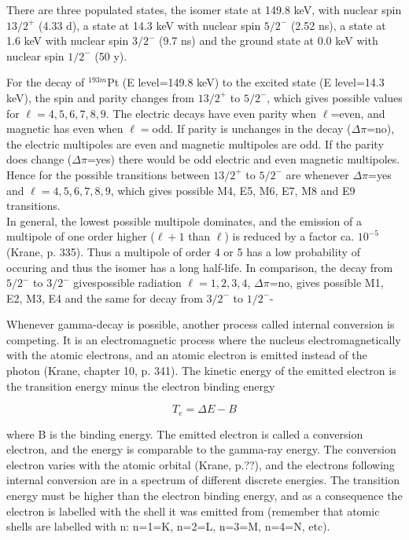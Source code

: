 \documentclass[a4paper,11pt,twoside]{book}
\begin{document}
There are three populated states, the isomer state at 149.8 keV, with nuclear spin $13/2^+$ (4.33 d), a state at 14.3 keV with nuclear spin $5/2^-$ (2.52 ns), a state at 1.6 keV with nuclear spin $3/2^-$ (9.7 ns) and the ground state at 0.0 keV with nuclear spin $1/2^-$ (50 y)\cite{ShamsuzzohaBasunia2017a}. 

For the decay of $^{193m}$Pt (E level=149.8 keV) to the excited state (E level=14.3 keV), the spin and parity changes from $13/2^+$ to $5/2^-$, which gives possible values for $\ell=4,5,6,7,8,9$. The electric decays have even parity when $\ell$=even, and magnetic has even when $\ell=$odd. If parity is unchanges in the decay ($\Delta\pi$=no), the electric multipoles are even and magnetic multipoles are odd. If the parity does change ($\Delta \pi$=yes) there would be odd electric and even magnetic multipoles. Hence for the possible transitions between $13/2^+$ to $5/2^-$ are whenever $\Delta \pi$=yes and $\ell=4,5,6,7,8,9$, which gives possible M4, E5, M6, E7, M8 and E9 transitions. \\

In general, the lowest possible multipole dominates, and the emission of a multipole of one order higher  ($\ell+1$ than $\ell$) is reduced by a factor ca. $10^{-5}$ (Krane, p. 335). Thus a multipole of order 4 or 5 has a low probability of occuring and thus the isomer has a long half-life. In comparison, the decay from $5/2^-$ to $3/2^-$ givespossible radiation $\ell=1,2,3,4$, $\Delta\pi$=no, gives possible M1, E2, M3, E4 and the same for decay from $3/2^-$ to $1/2^-$- 

Whenever gamma-decay is possible, another process called internal conversion is competing. It is an electromagnetic process where the nucleus electromagnetically with the atomic electrons, and an atomic electron is emitted instead of the photon (Krane, chapter 10, p. 341). The kinetic energy of the emitted electron is the transition energy minus the electron binding energy 

\begin{equation}
    T_e = \Delta E -B
\end{equation}

where B is the binding energy. The emitted electron is called a conversion electron, and the energy is comparable to the gamma-ray energy. The conversion electron varies with the atomic orbital (Krane, p.??), and the electrons following internal conversion are in a spectrum of different discrete energies. The transition energy must be higher than the electron binding energy, and as a consequence the electron is labelled with the shell it was emitted from (remember that atomic shells are labelled with n: n=1=K, n=2=L, n=3=M, n=4=N, etc). \\
\end{document}
